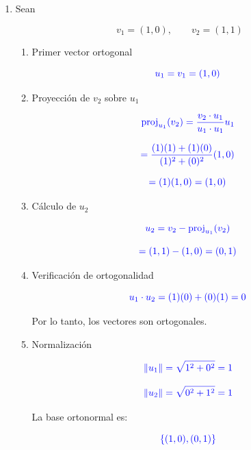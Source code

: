 \documentclass[12pt,letterpaper]{article}
\newcommand{\respuesta}[1]{
\[
\textcolor{blue}{#1}
\]
}
\begin{document}
\begin{enumerate}[label=\textbf{\arabic*.}]


\item Sean

\[
v_1=(1,0),
\qquad
v_2=(1,1)
\]

\begin{enumerate}[label=\alph*)]

\item Primer vector ortogonal

\respuesta{
u_1=v_1=(1,0)
}

\item Proyección de \(v_2\) sobre \(u_1\)

\respuesta{
\operatorname{proj}_{u_1}(v_2)
=
\frac{v_2\cdot u_1}{u_1\cdot u_1}u_1
}

\respuesta{
=
\frac{(1)(1)+(1)(0)}{(1)^2+(0)^2}(1,0)
}

\respuesta{
=(1)(1,0)=(1,0)
}

\item Cálculo de \(u_2\)

\respuesta{
u_2=v_2-\operatorname{proj}_{u_1}(v_2)
}

\respuesta{
=(1,1)-(1,0)=(0,1)
}

\item Verificación de ortogonalidad

\respuesta{
u_1\cdot u_2=(1)(0)+(0)(1)=0
}

Por lo tanto, los vectores son ortogonales.

\item Normalización

\respuesta{
\|u_1\|=\sqrt{1^2+0^2}=1
}

\respuesta{
\|u_2\|=\sqrt{0^2+1^2}=1
}

La base ortonormal es:

\respuesta{
\left\{
(1,0),
(0,1)
\right\}
}

\end{enumerate}

\vspace{0.5cm}



\end{enumerate}
\end{document}
